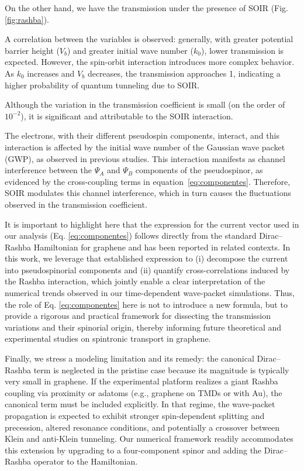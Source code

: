 On the other hand, we have the transmission under the presence of SOIR (Fig.\ref{fig:rashba}).

A correlation between the variables is observed: generally, with greater potential barrier height ($V_b$) and greater initial wave number ($k_0$), lower transmission is expected.
However, the spin-orbit interaction introduces more complex behavior.
As $k_0$ increases and $V_b$ decreases, the transmission approaches 1, indicating a higher probability of quantum tunneling due to SOIR\@.

Although the variation in the transmission coefficient is small (on the order of $10^{-2}$), it is significant and attributable to the SOIR interaction.

The electrons, with their different pseudospin components, interact, and this interaction is affected by the initial wave number of the Gaussian wave packet (GWP), as observed in previous studies\cite{Serna2019}.
This interaction manifests as channel interference between the $\Psi_A$ and $\Psi_B$ components of the pseudospinor, as evidenced by the cross-coupling terms in equation~\ref{eq:componentes}.
Therefore, SOIR modulates this channel interference, which in turn causes the fluctuations observed in the transmission coefficient.

It is important to highlight here that the expression for the current vector used in our analysis (Eq. \ref{eq:componentes}) follows directly from the standard Dirac–Rashba Hamiltonian for graphene and has been reported in related contexts\cite{AvishaiPhysRevB2021}.
In this work, we leverage that established expression to (i) decompose the current into pseudospinorial components and (ii) quantify cross-correlations induced by the Rashba interaction, which jointly enable a clear interpretation of the numerical trends observed in our time-dependent wave-packet simulations.
Thus, the role of Eq. \ref{eq:componentes} here is not to introduce a new formula, but to provide a rigorous and practical framework for dissecting the transmission variations and their spinorial origin\cite{Serna2019}, thereby informing future theoretical and experimental studies on spintronic transport in graphene.

Finally, we stress a modeling limitation and its remedy: the canonical Dirac–Rashba term is neglected in the pristine case because its magnitude is typically very small in graphene.
If the experimental platform realizes a giant Rashba coupling via proximity or adatoms (e.g., graphene on TMDs or with Au), the canonical term must be included explicitly.
In that regime, the wave-packet propagation is expected to exhibit stronger spin-dependent splitting and precession, altered resonance conditions, and potentially a crossover between Klein and anti-Klein tunneling\cite{DellAnnaJPhysCondMatt2018, AvsarNatCommun2014, WangPhysRevX2016}.
Our numerical framework readily accommodates this extension by upgrading to a four-component spinor and adding the Dirac–Rashba operator to the Hamiltonian.


